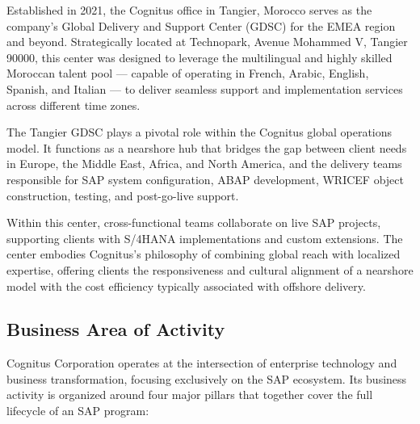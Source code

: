 Established in 2021, the Cognitus office in Tangier, Morocco serves as the company's Global Delivery and Support Center (GDSC) for the EMEA region and beyond. Strategically located at Technopark, Avenue Mohammed V, Tangier 90000, this center was designed to leverage the multilingual and highly skilled Moroccan talent pool --- capable of operating in French, Arabic, English, Spanish, and Italian --- to deliver seamless support and implementation services across different time zones.

The Tangier GDSC plays a pivotal role within the Cognitus global operations model. It functions as a nearshore hub that bridges the gap between client needs in Europe, the Middle East, Africa, and North America, and the delivery teams responsible for SAP system configuration, ABAP development, WRICEF object construction, testing, and post-go-live support.

Within this center, cross-functional teams collaborate on live SAP projects, supporting clients with S/4HANA implementations and custom extensions. The center embodies Cognitus's philosophy of combining global reach with localized expertise, offering clients the responsiveness and cultural alignment of a nearshore model with the cost efficiency typically associated with offshore delivery.

\subsection{Business Area of Activity}

Cognitus Corporation operates at the intersection of enterprise technology and business transformation, focusing exclusively on the SAP ecosystem. Its business activity is organized around four major pillars that together cover the full lifecycle of an SAP program:

